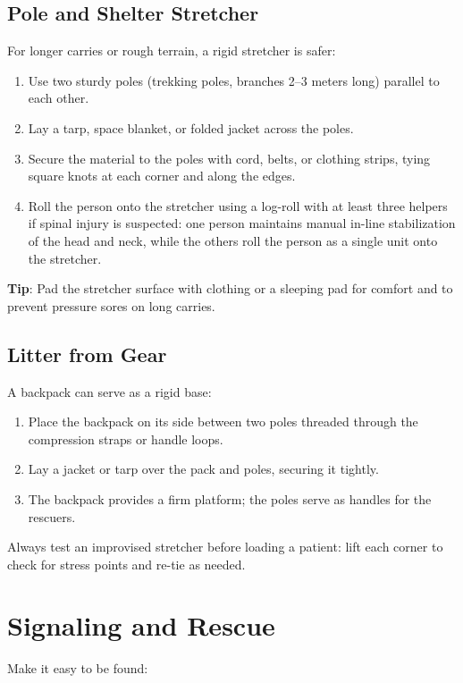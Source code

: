 \subsection{Pole and Shelter Stretcher}
For longer carries or rough terrain, a rigid stretcher is safer:
\begin{enumerate}
  \item Use two sturdy poles (trekking poles, branches 2--3 meters long) parallel to each other.
  \item Lay a tarp, space blanket, or folded jacket across the poles.
  \item Secure the material to the poles with cord, belts, or clothing strips, tying square knots at each corner and along the edges.
  \item Roll the person onto the stretcher using a log-roll with at least three helpers if spinal injury is suspected: one person maintains manual in-line stabilization of the head and neck, while the others roll the person as a single unit onto the stretcher.
\end{enumerate}
\textbf{Tip}: Pad the stretcher surface with clothing or a sleeping pad for comfort and to prevent pressure sores on long carries.

\subsection{Litter from Gear}
A backpack can serve as a rigid base:
\begin{enumerate}
  \item Place the backpack on its side between two poles threaded through the compression straps or handle loops.
  \item Lay a jacket or tarp over the pack and poles, securing it tightly.
  \item The backpack provides a firm platform; the poles serve as handles for the rescuers.
\end{enumerate}
Always test an improvised stretcher before loading a patient: lift each corner to check for stress points and re-tie as needed.

\section{Signaling and Rescue}

Make it easy to be found:

